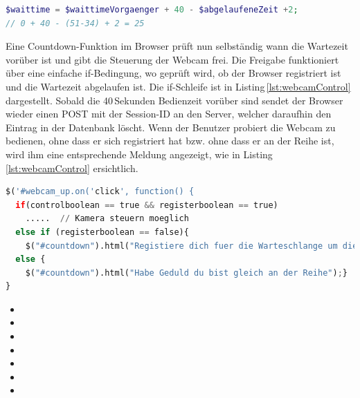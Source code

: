 \begin{lstlisting}[label=lst:wartezeit, language=PHP, style=PHP]
$waittime = $waittimeVorgaenger + 40 - $abgelaufeneZeit +2;
// 0 + 40 - (51-34) + 2 = 25
\end{lstlisting}


\noindent
Eine Countdown-Funktion im Browser prüft nun selbständig wann die Wartezeit vorüber ist und gibt die Steuerung der Webcam frei. Die Freigabe funktioniert über eine einfache if-Bedingung, wo geprüft wird, ob der Browser registriert ist und die Wartezeit abgelaufen ist. Die if-Schleife ist in Listing\,\ref{lst:webcamControl} dargestellt.
Sobald die 40\,Sekunden Bedienzeit vorüber sind sendet der Browser wieder einen POST mit der Session-ID an den Server, welcher daraufhin den Eintrag in der Datenbank löscht. Wenn der Benutzer probiert die Webcam zu bedienen, ohne dass er sich registriert hat bzw. ohne dass er an der Reihe ist, wird ihm eine entsprechende Meldung angezeigt, wie in Listing\,\ref{lst:webcamControl} ersichtlich.

\begin{lstlisting}[label=lst:webcamControl, language=Python, style=py]
$('#webcam_up.on('click', function() {
  if(controlboolean == true && registerboolean == true)
    .....  // Kamera steuern moeglich
  else if (registerboolean == false){
    $("#countdown").html("Registiere dich fuer die Warteschlange um die Kamera zu bedienen");}
  else {
    $("#countdown").html("Habe Geduld du bist gleich an der Reihe");}
}
\end{lstlisting}


\begin{itemize}
\item {}
\item {}
\item {}
\item {}
\item {}
\item {}
\item {}
\end{itemize}
